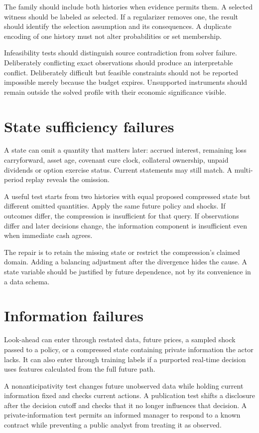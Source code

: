 The family should include both histories when evidence permits them. A selected witness should be labeled as selected. If a regularizer removes one, the result should identify the selection assumption and its consequences. A duplicate encoding of one history must not alter probabilities or set membership.

Infeasibility tests should distinguish source contradiction from solver failure. Deliberately conflicting exact observations should produce an interpretable conflict. Deliberately difficult but feasible constraints should not be reported impossible merely because the budget expires. Unsupported instruments should remain outside the solved profile with their economic significance visible.

\section{State sufficiency failures}
A state can omit a quantity that matters later: accrued interest, remaining loss carryforward, asset age, covenant cure clock, collateral ownership, unpaid dividends or option exercise status. Current statements may still match. A multi-period replay reveals the omission.

A useful test starts from two histories with equal proposed compressed state but different omitted quantities. Apply the same future policy and shocks. If outcomes differ, the compression is insufficient for that query. If observations differ and later decisions change, the information component is insufficient even when immediate cash agrees.

The repair is to retain the missing state or restrict the compression's claimed domain. Adding a balancing adjustment after the divergence hides the cause. A state variable should be justified by future dependence, not by its convenience in a data schema.

\section{Information failures}
Look-ahead can enter through restated data, future prices, a sampled shock passed to a policy, or a compressed state containing private information the actor lacks. It can also enter through training labels if a purported real-time decision uses features calculated from the full future path.

A nonanticipativity test changes future unobserved data while holding current information fixed and checks current actions. A publication test shifts a disclosure after the decision cutoff and checks that it no longer influences that decision. A private-information test permits an informed manager to respond to a known contract while preventing a public analyst from treating it as observed.

